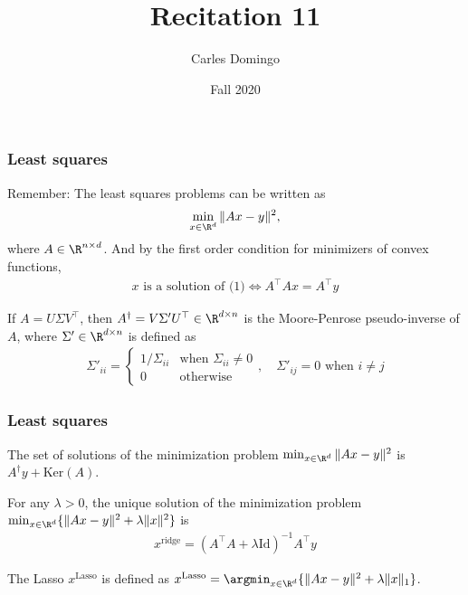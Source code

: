 \documentclass{beamer}
\title{Recitation 11}
\author{Carles Domingo}
\date{Fall 2020}
\begin{document}
\frame{\titlepage} 

\setcounter{showProgressBar}{0}
\setcounter{showSlideNumbers}{1}

\begin{frame}[t]
\frametitle{Least squares}
\vspace{-10pt}
Remember: The least squares problems can be written as 
\begin{align} \label{eq:least_sq}
\min_{x \in \R^d} \|Ax - y\|^2,
\end{align}
where $A \in \R^{n \times d}$. And by the first order condition for minimizers of convex functions,
\begin{align*}
x \text{ is a solution of (1)} \iff  A^\top A x = A^\top y
\end{align*}
\begin{definition}
If $A = U \Sigma V^{\top}$, then $A^{\dagger} = V \Sigma' U^\top \in \R^{d \times n}$ is the Moore-Penrose pseudo-inverse of $A$, where $\Sigma' \in \R^{d \times n}$ is defined as
\begin{align*}
\Sigma'_{ii} = 
\begin{cases}
1/\Sigma_{ii}  & \text{when } \Sigma_{ii} \neq 0 \\
0 & \text{otherwise}
\end{cases}, \quad
\Sigma'_{ij} = 0 \text{ when } i \neq j
\end{align*}
\end{definition}
\end{frame}

\begin{frame}[t]
\frametitle{Least squares}
\vspace{-10pt}
\begin{theorem} 
The set of solutions of the minimization problem $\min_{x \in \R^d} \|Ax - y\|^2$ is
$A^{\dagger} y + \text{Ker}(A)$.
\end{theorem}

\begin{theorem} 
For any $\lambda > 0$, the unique solution of the minimization problem $\min_{x \in \R^d} \{ \|Ax - y\|^2 + \lambda \|x\|^2 \}$ is
\begin{align*}
x^{\text{ridge}} = (A^{\top} A + \lambda \text{Id} )^{-1} A^{\top} y
\end{align*}
\end{theorem}

\begin{definition} [Lasso]
The Lasso $x^{\text{Lasso}}$ is defined as $x^{\text{Lasso}} = \argmin_{x \in \R^d} \{  \|Ax - y\|^2 + \lambda \|x\|_1 \}$.
\end{definition}
\end{frame}
\end{document}
